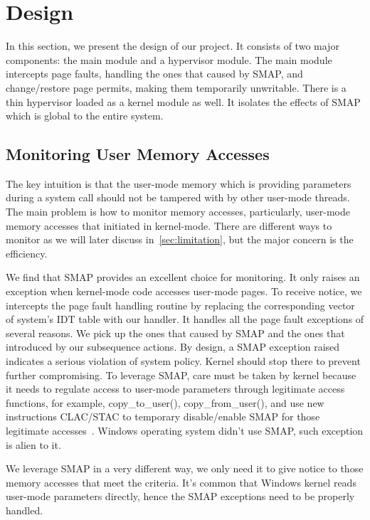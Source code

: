 \section{Design}
\label{sec:design}

In this section, we present the design of our project. It consists of two major components: the main module and a hypervisor module. The main module intercepts page faults, handling the ones that caused by SMAP, and change/restore page permits, making them temporarily unwritable. There is a thin hypervisor loaded as a kernel module as well. It isolates the effects of SMAP which is global to the entire system.

\subsection{Monitoring User Memory Accesses}

The key intuition is that the user-mode memory which is providing parameters during a system call should not be tampered with by other user-mode threads. 
The main problem is how to monitor memory accesses, particularly, user-mode memory accesses that initiated in kernel-mode.  There are different ways to monitor as we will later discuss in~\autoref{sec:limitation}, but the major concern is the efficiency.

We find that SMAP provides an excellent choice for monitoring. It only raises an exception when kernel-mode code accesses user-mode pages. To receive notice, we intercepts the page fault handling routine by replacing the corresponding vector of system's IDT table with our handler. It handles all the page fault exceptions  of several reasons. We pick up the ones that caused by SMAP and the ones that introduced by our subsequence actions. By design, a SMAP exception raised indicates a serious violation of system policy. Kernel should stop there to prevent further compromising. To leverage SMAP, care must be taken by kernel because it needs to regulate access to user-mode parameters through legitimate access functions, for example, copy_to_user(), copy_from_user(), and use new instructions CLAC/STAC to temporary disable/enable SMAP for those legitimate accesses~\cite{corbet2012linuxsmap}. Windows operating system didn't use SMAP, such exception is alien to it. 

We leverage SMAP in a very different way, we only need it to give notice to those memory accesses that meet the criteria. It's common that Windows kernel reads user-mode parameters directly, hence the SMAP exceptions need to be properly handled. 

